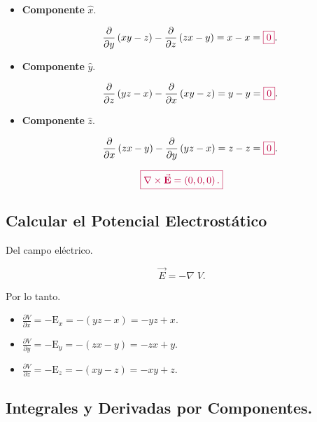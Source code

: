 \documentclass[a4paper,12pt]{article} %
\begin{document}
\begin{itemize}
	\item \textbf{Componente }\(\hat{x}.\)

	      \[\frac{\partial}{\partial y}\left(xy - z\right) - \frac{\partial}{\partial z}\left(zx - y\right) = x - x = \textcolor{purple}{\boxed{0}}. \]

	\item \textbf{Componente }\(\hat{y}.\)

	      \[\frac{\partial}{\partial z}\left(yz - x\right) - \frac{\partial}{\partial x}\left(xy - z\right) = y - y = \textcolor{purple}{\boxed{0}}. \]

	\item \textbf{Componente }\(\hat{z}.\)

	      \[\frac{\partial}{\partial x}\left(zx - y\right) - \frac{\partial}{\partial y}\left(yz - x \right) = z - z = \textcolor{purple}{\boxed{0}}. \]

\end{itemize}

\[ \textcolor{purple}{\boxed{\nabla \times \vec{\mathbf{E}} = \left( 0, 0, 0\right).}} \]

\subsection{Calcular el Potencial Electrostático}

\begin{justify}
	Del campo eléctrico.
\end{justify}

\[ \vec{E} = - \nabla \; V.\]

\begin{justify}
	Por lo tanto.
\end{justify}

\begin{itemize}
	\item \(\frac{\partial V}{\partial x} = -\mathrm{E}_x = -\left( yz - x \right) = -yz + x.\)

	\item \(\frac{\partial V}{\partial y} = -\mathrm{E}_y = -\left(zx - y\right) = -zx +y. \)

	\item \(\frac{\partial V}{\partial z} = -\mathrm{E}_z = -\left(xy - z \right) = -xy +z. \)
\end{itemize}

\subsection{Integrales y Derivadas por Componentes.}
\end{document}
